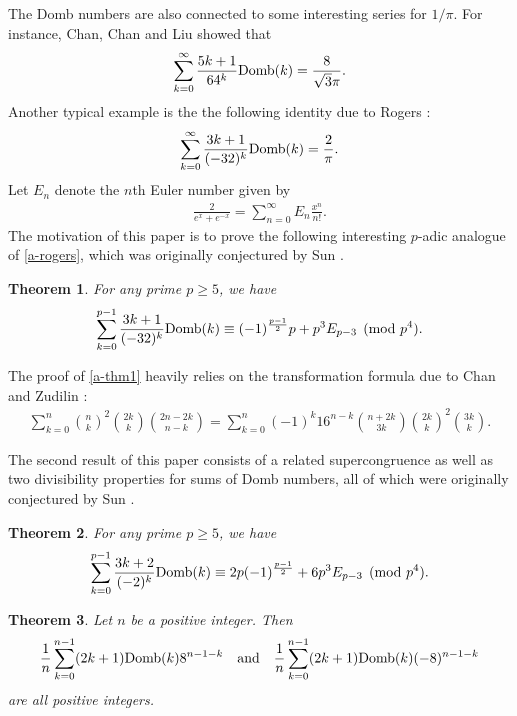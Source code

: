 \documentclass[12pt]{article}
\newtheorem{thm}{Theorem}[section]
\numberwithin{equation}{section}
\begin{document}
The Domb numbers are also connected to some interesting series for $1/\pi$. For instance,
Chan, Chan and Liu \cite{ccl-am-2004} showed that
\begin{align*}
\sum_{k=0}^{\infty}\frac{5k+1}{64^k}{\rm Domb}(k)=\frac{8}{\sqrt{3}\pi}.
\end{align*}
Another typical example is the the following identity due to Rogers \cite{rogers-rj-2009}:
\begin{align}
\sum_{k=0}^{\infty}\frac{3k+1}{(-32)^k}{\rm Domb}(k)=\frac{2}{\pi}.\label{a-rogers}
\end{align}
Let $E_n$ denote the $n$th Euler number given by
\begin{align*}
\frac{2}{e^x+e^{-x}}=\sum_{n=0}^{\infty}E_n\frac{x^n}{n!}.
\end{align*}
The motivation of this paper is to prove the following interesting $p$-adic analogue of \eqref{a-rogers}, which was originally conjectured by Sun \cite[Conjecture 77 (ii)]{sunzw-2019}.
\begin{thm}\label{t-1}
For any prime $p\ge 5$, we have
\begin{align}
\sum_{k=0}^{p-1}\frac{3k+1}{(-32)^k}{\rm Domb}(k)\equiv (-1)^{\frac{p-1}{2}}p+p^3E_{p-3}
\pmod{p^4}.\label{a-thm1}
\end{align}
\end{thm}

The proof of \eqref{a-thm1} heavily relies on the transformation formula due to Chan and Zudilin \cite[Corollary 3.4]{cz-m-2010}:
\begin{align}
\sum_{k=0}^n{n\choose k}^2{2k\choose k}{2n-2k\choose n-k}=
\sum_{k=0}^n(-1)^k16^{n-k}{n+2k\choose 3k}{2k\choose k}^2{3k\choose k}.\label{a-cz}
\end{align}

The second result of this paper consists of a related supercongruence as well as two
divisibility properties for sums of Domb numbers, all of which were originally conjectured by
Sun \cite[Conjecture 77]{sunzw-2019}.
\begin{thm}\label{t-2}
For any prime $p\ge 5$, we have
\begin{align}
\sum_{k=0}^{p-1}\frac{3k+2}{(-2)^k}{\rm Domb}(k)\equiv 2p(-1)^{\frac{p-1}{2}}+6p^3E_{p-3}
\pmod{p^4}.\label{a-thm2}
\end{align}
\end{thm}

\begin{thm}\label{t-3}
Let $n$ be a positive integer. Then
\begin{align*}
\frac{1}{n}\sum_{k=0}^{n-1}(2k+1){\rm Domb}(k)8^{n-1-k}
\quad \text{and}\quad\frac{1}{n}\sum_{k=0}^{n-1}(2k+1){\rm Domb}(k)(-8)^{n-1-k}
\end{align*}
are all positive integers.
\end{thm}
\end{document}
